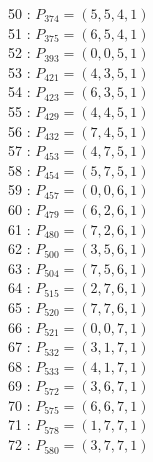 \documentclass{article}
\begin{document}
{\begin{multicols}{3}
50 : $P_{374}=( 5, 5, 4, 1 )$\\
51 : $P_{375}=( 6, 5, 4, 1 )$\\
52 : $P_{393}=( 0, 0, 5, 1 )$\\
53 : $P_{421}=( 4, 3, 5, 1 )$\\
54 : $P_{423}=( 6, 3, 5, 1 )$\\
55 : $P_{429}=( 4, 4, 5, 1 )$\\
56 : $P_{432}=( 7, 4, 5, 1 )$\\
57 : $P_{453}=( 4, 7, 5, 1 )$\\
58 : $P_{454}=( 5, 7, 5, 1 )$\\
59 : $P_{457}=( 0, 0, 6, 1 )$\\
60 : $P_{479}=( 6, 2, 6, 1 )$\\
61 : $P_{480}=( 7, 2, 6, 1 )$\\
62 : $P_{500}=( 3, 5, 6, 1 )$\\
63 : $P_{504}=( 7, 5, 6, 1 )$\\
64 : $P_{515}=( 2, 7, 6, 1 )$\\
65 : $P_{520}=( 7, 7, 6, 1 )$\\
66 : $P_{521}=( 0, 0, 7, 1 )$\\
67 : $P_{532}=( 3, 1, 7, 1 )$\\
68 : $P_{533}=( 4, 1, 7, 1 )$\\
69 : $P_{572}=( 3, 6, 7, 1 )$\\
70 : $P_{575}=( 6, 6, 7, 1 )$\\
71 : $P_{578}=( 1, 7, 7, 1 )$\\
72 : $P_{580}=( 3, 7, 7, 1 )$\\
\end{multicols}


%


%


}%
\end{document}
